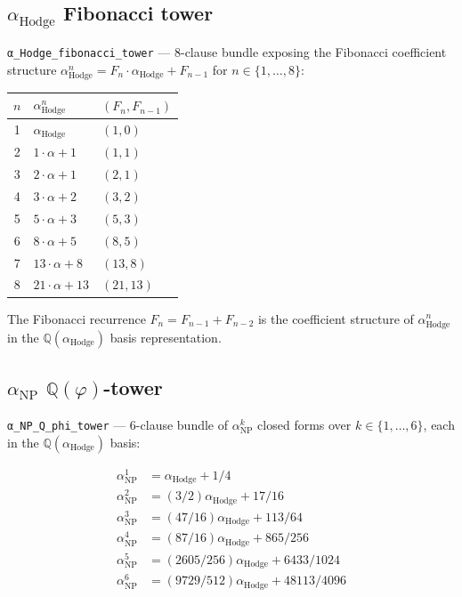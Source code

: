 \subsection{\texorpdfstring{$\alpha_{\text{Hodge}}$}{alpha\_Hodge} Fibonacci tower}

\verb|α_Hodge_fibonacci_tower| --- 8-clause bundle exposing the
Fibonacci coefficient structure $\alpha_{\text{Hodge}}^n
= F_n \cdot \alpha_{\text{Hodge}} + F_{n-1}$ for $n \in \{1,\ldots,8\}$:

\begin{tabular}{|c|l|l|}
\hline
$n$ & $\alpha_{\text{Hodge}}^n$ & $(F_n, F_{n-1})$ \\
\hline
1 & $\alpha_{\text{Hodge}}$       & $(1, 0)$ \\
2 & $1 \cdot \alpha + 1$          & $(1, 1)$ \\
3 & $2 \cdot \alpha + 1$          & $(2, 1)$ \\
4 & $3 \cdot \alpha + 2$          & $(3, 2)$ \\
5 & $5 \cdot \alpha + 3$          & $(5, 3)$ \\
6 & $8 \cdot \alpha + 5$          & $(8, 5)$ \\
7 & $13 \cdot \alpha + 8$         & $(13, 8)$ \\
8 & $21 \cdot \alpha + 13$        & $(21, 13)$ \\
\hline
\end{tabular}

The Fibonacci recurrence $F_n = F_{n-1} + F_{n-2}$ is the coefficient
structure of $\alpha_{\text{Hodge}}^n$ in the $\mathbb{Q}(\alpha_{\text{Hodge}})$
basis representation.

\subsection{\texorpdfstring{$\alpha_{\text{NP}}$ $\mathbb{Q}(\varphi)$}{alpha\_NP Q(phi)}-tower}

\verb|α_NP_Q_phi_tower| --- 6-clause bundle of $\alpha_{\text{NP}}^k$
closed forms over $k \in \{1,\ldots,6\}$, each in the
$\mathbb{Q}(\alpha_{\text{Hodge}})$ basis:

\begin{align*}
\alpha_{\text{NP}}^1 &= \alpha_{\text{Hodge}} + 1/4 \\
\alpha_{\text{NP}}^2 &= (3/2) \alpha_{\text{Hodge}} + 17/16 \\
\alpha_{\text{NP}}^3 &= (47/16) \alpha_{\text{Hodge}} + 113/64 \\
\alpha_{\text{NP}}^4 &= (87/16) \alpha_{\text{Hodge}} + 865/256 \\
\alpha_{\text{NP}}^5 &= (2605/256) \alpha_{\text{Hodge}} + 6433/1024 \\
\alpha_{\text{NP}}^6 &= (9729/512) \alpha_{\text{Hodge}} + 48113/4096
\end{align*}

